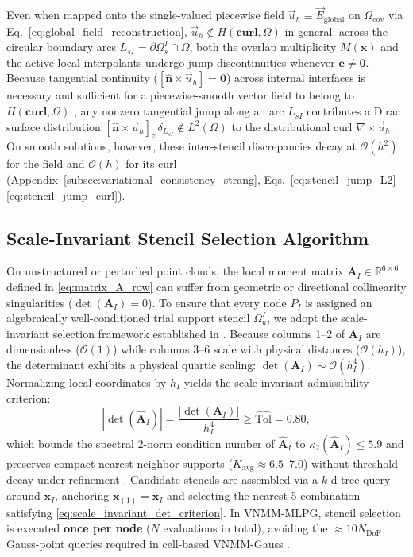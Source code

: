 \documentclass[VANCOUVER]{USG}
\begin{document}
Even when mapped onto the single-valued piecewise field $\vec{u}_h \equiv \vec{E}_{\mathrm{global}}$ on $\Omega_{\mathrm{cov}}$ via Eq.~\eqref{eq:global_field_reconstruction}, $\vec{u}_h \notin H(\mathbf{curl}, \Omega)$ in general: across the circular boundary arcs $L_{sI} = \partial\Omega_s^I \cap \Omega$, both the overlap multiplicity $M(\mathbf{x})$ and the active local interpolants undergo jump discontinuities whenever $\mathbf{e} \ne \mathbf{0}$. Because tangential continuity ($[\hat{\mathbf{n}} \times \vec{u}_h] = \mathbf{0}$) across internal interfaces is necessary and sufficient for a piecewise-smooth vector field to belong to $H(\mathbf{curl}, \Omega)$ \cite{monk2003finite, boffi2013mixed}, any nonzero tangential jump along an arc $L_{sI}$ contributes a Dirac surface distribution $[\hat{\mathbf{n}} \times \vec{u}_h]_z\,\delta_{L_{sI}} \notin L^2(\Omega)$ to the distributional curl $\nabla \times \vec{u}_h$. On smooth solutions, however, these inter-stencil discrepancies decay at $\mathcal{O}(h^2)$ for the field and $\mathcal{O}(h)$ for its curl (Appendix~\ref{subsec:variational_consistency_strang}, Eqs.~\eqref{eq:stencil_jump_L2}--\eqref{eq:stencil_jump_curl}).

\subsection{Scale-Invariant Stencil Selection Algorithm}
\label{subsec:stencil_selection}

On unstructured or perturbed point clouds, the local moment matrix $\mathbf{A}_I \in \mathbb{R}^{6 \times 6}$ defined in \eqref{eq:matrix_A_row} can suffer from geometric or directional collinearity singularities ($\det(\mathbf{A}_I) = 0$). To ensure that every node $P_I$ is assigned an algebraically well-conditioned trial support stencil $\Omega_u^I$, we adopt the scale-invariant selection framework established in \cite{stable_vnmm2d_2026}.
Because columns 1--2 of $\mathbf{A}_I$ are dimensionless ($\mathcal{O}(1)$) while columns 3--6 scale with physical distances ($\mathcal{O}(h_I)$), the determinant exhibits a physical quartic scaling: $\det(\mathbf{A}_I) \sim \mathcal{O}(h_I^4)$. Normalizing local coordinates by $h_I$ yields the scale-invariant admissibility criterion:
\begin{equation}
    |\det(\widehat{\mathbf{A}}_I)| = \frac{|\det(\mathbf{A}_I)|}{h_I^4} \ge \widehat{\mathrm{Tol}} = 0.80,
    \label{eq:scale_invariant_det_criterion}
\end{equation}
which bounds the spectral 2-norm condition number of $\widehat{\mathbf{A}}_I$ to $\kappa_2(\widehat{\mathbf{A}}_I) \le 5.9$ and preserves compact nearest-neighbor supports ($K_{\mathrm{avg}} \approx 6.5\text{--}7.0$) without threshold decay under refinement \cite{stable_vnmm2d_2026}. Candidate stencils are assembled via a $k$-d tree query around $\mathbf{x}_I$, anchoring $\mathbf{x}_{(1)} = \mathbf{x}_I$ and selecting the nearest 5-combination satisfying \eqref{eq:scale_invariant_det_criterion}. In VNMM-MLPG, stencil selection is executed \textbf{once per node} ($N$ evaluations in total), avoiding the $\approx 10 N_{\mathrm{DoF}}$ Gauss-point queries required in cell-based VNMM-Gauss \cite{stable_vnmm2d_2026}.
\end{document}
